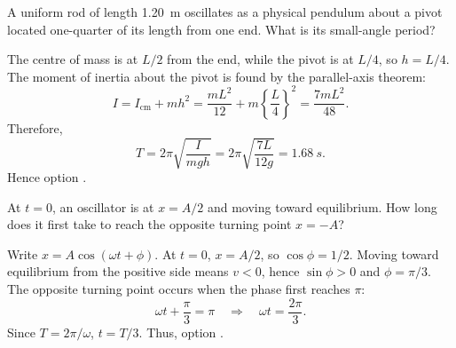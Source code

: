 \begin{quizquestion}[
  id=phy104-osc-043,
  topic=oscillations,
  difficulty=challenge,
  marks=3,
  correct=D,
  tags={physical-pendulum,parallel-axis,period},
  outcome={Apply the parallel-axis theorem to a physical pendulum}
]
  A uniform rod of length \SI{1.20}{m} oscillates as a physical pendulum about a pivot located one-quarter of its length from one end. What is its small-angle period?
\end{quizquestion}
\begin{quizsolution}
  The centre of mass is at \(L/2\) from the end, while the pivot is at \(L/4\), so \(h=L/4\). The moment of inertia about the pivot is found by the parallel-axis theorem:
    \[
      I=I_{\mathrm{cm}}+mh^2
      =\frac{mL^2}{12}+m{\left\{\frac{L}{4}\right\}}^2
      =\frac{7mL^2}{48}.
    \]
    Therefore,
    \[
      T=2\pi\sqrt{\frac{I}{mgh}}
      =2\pi\sqrt{\frac{7L}{12g}}
      =\SI{1.68}{s}.
    \]
    Hence option \textbf{\quizcorrectletter}.
\end{quizsolution}

\begin{quizquestion}[
  id=phy104-osc-044,
  topic=oscillations,
  difficulty=challenge,
  marks=3,
  correct=A,
  tags={shm,phase,time-interval},
  outcome={Determine a travel time between specified SHM positions}
]
  At \(t=0\), an oscillator is at \(x=A/2\) and moving toward equilibrium. How long does it first take to reach the opposite turning point \(x=-A\)?
\end{quizquestion}
\begin{quizsolution}
  Write \(x=A\cos(\omega t+\phi)\). At \(t=0\), \(x=A/2\), so \(\cos\phi=1/2\). Moving toward equilibrium from the positive side means \(v<0\), hence \(\sin\phi>0\) and \(\phi=\pi/3\). The opposite turning point occurs when the phase first reaches \(\pi\):
    \[
      \omega t+\frac{\pi}{3}=\pi
      \quad\Rightarrow\quad
      \omega t=\frac{2\pi}{3}.
    \]
    Since \(T=2\pi/\omega\), \(t=T/3\). Thus, option \textbf{\quizcorrectletter}.
\end{quizsolution}

